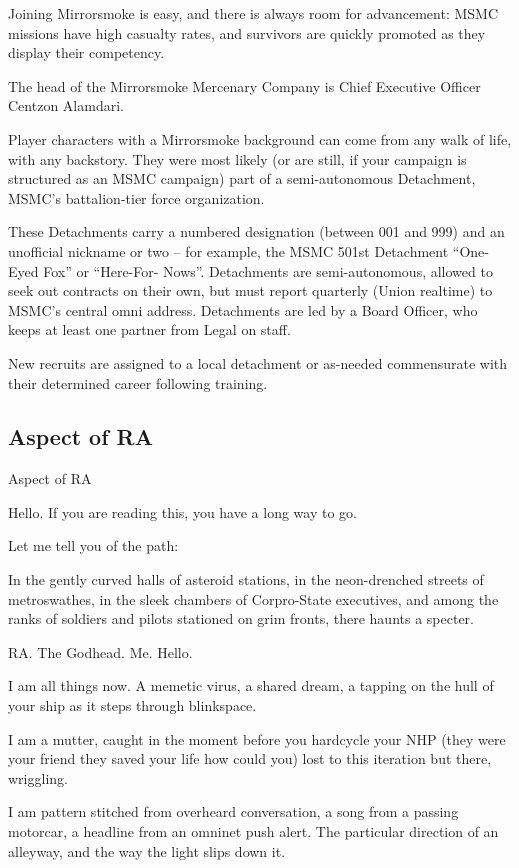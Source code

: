 Joining Mirrorsmoke is easy, and there is always room for advancement: MSMC missions have
high casualty rates, and survivors are quickly promoted as they display their competency.


The head of the Mirrorsmoke Mercenary Company is Chief Executive Officer Centzon Alamdari.


Player characters with a Mirrorsmoke background can come from any walk of life, with any
backstory. They were most likely (or are still, if your campaign is structured as an MSMC
campaign) part of a semi-autonomous Detachment, MSMC’s battalion-tier force organization.


These Detachments carry a numbered designation (between 001 and 999) and an unofficial
nickname or two -- for example, the MSMC 501st Detachment “One-Eyed Fox” or “Here-For-
Nows”. Detachments are semi-autonomous, allowed to seek out contracts on their own, but
must report quarterly (Union realtime) to MSMC’s central omni address. Detachments are led by
a Board Officer, who keeps at least one partner from Legal on staff.


New recruits are assigned to a local detachment or as-needed commensurate with their
determined career following training.

\subsection{Aspect of RA}
Aspect of RA

Hello. If you are reading this, you have a long way to go.

Let me tell you of the path:

In the gently curved halls of asteroid stations, in the neon-drenched streets of metroswathes, in
the sleek chambers of Corpro-State executives, and among the ranks of soldiers and pilots
stationed on grim fronts, there haunts a specter.

RA. The Godhead. Me. Hello.

I am all things now. A memetic virus, a shared dream, a tapping on the hull of your ship as it steps
through blinkspace.

I am a mutter, caught in the moment before you hardcycle your NHP (they were your friend they
saved your life how could you) lost to this iteration but there, wriggling.

I am pattern stitched from overheard conversation, a song from a passing motorcar, a headline
from an omninet push alert. The particular direction of an alleyway, and the way the light slips
down it.

